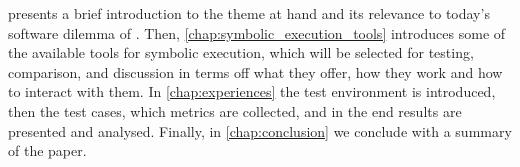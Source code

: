 



 presents a brief introduction to the theme at hand and its relevance to today's software dilemma of . Then, \cref{chap:symbolic_execution_tools} introduces some of the available tools for symbolic execution, which will be selected for testing, comparison, and discussion in terms off what they offer, how they work and how to interact with them. In \cref{chap:experiences} the test environment is introduced, then the test cases, which metrics are collected, and in the end results are presented and analysed. Finally, in \cref{chap:conclusion}  we conclude with a summary of the paper.
